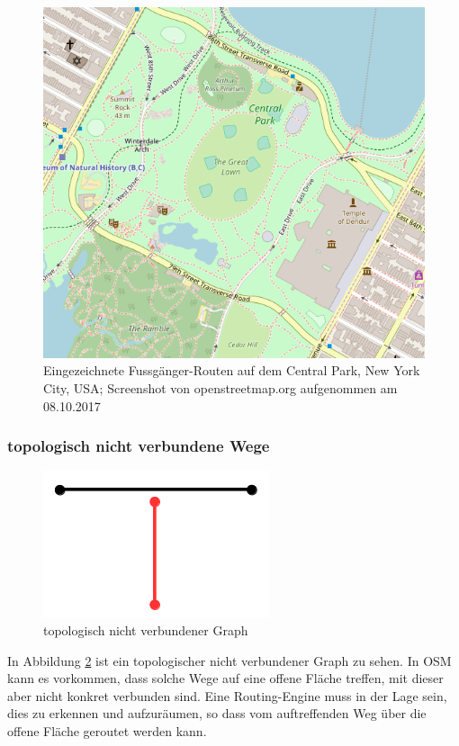 \begin{figure}[ht]
\centering
\includegraphics[width=0.5\linewidth]{technicalreport/img/central_park}
\caption[eingezeichnete Fussgänger-Routen]{Eingezeichnete Fussgänger-Routen auf dem Central Park, New York City, USA; Screenshot von openstreetmap.org aufgenommen am 08.10.2017}
\label{fig:central_park}
\end{figure}


\subsubsection{topologisch nicht verbundene Wege}
\label{subsub:topologisch nicht verbundene Wege}

\begin{figure}[ht]
\centering
\includegraphics[width=0.5\linewidth]{technicalreport/img/topologisch_nicht_verbundener_graph}
\caption[topologisch nicht verbundener Graph]{topologisch nicht verbundener Graph}
\label{fig:topologisch_nicht_verbundener_graph}
\end{figure}

In Abbildung \ref{fig:topologisch_nicht_verbundener_graph} ist ein topologischer nicht verbundener Graph zu sehen. In OSM kann es vorkommen, dass solche Wege auf eine offene Fläche treffen, mit dieser aber nicht konkret verbunden sind. Eine Routing-Engine muss in der Lage sein, dies zu erkennen und aufzuräumen, so dass vom auftreffenden Weg über die offene Fläche geroutet werden kann.

